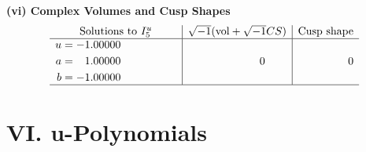 \documentclass[1p]{elsarticle_modified}
\theoremstyle{definition}
\newcommand{\I}{\sqrt{-1}}
\begin{document}
\newpage\flushleft \textbf{(vi) Complex Volumes and Cusp Shapes}
$$\begin{array}{c|c|c}  
\text{Solutions to }I^u_{5}& \I (\text{vol} + \sqrt{-1}CS) & \text{Cusp shape}\\
 \hline 
\begin{aligned}
u &= -1.00000\phantom{ +0.000000I} \\
a &= \phantom{-}1.00000\phantom{ +0.000000I} \\
b &= -1.00000\phantom{ +0.000000I}\end{aligned}
 & \phantom{-0.000000 } 0 & \phantom{-0.000000 } 0\\
 \hline 
 \end{array}$$\newpage
\newpage\renewcommand{\arraystretch}{1}
\centering \section*{ VI. u-Polynomials}
\end{document}
